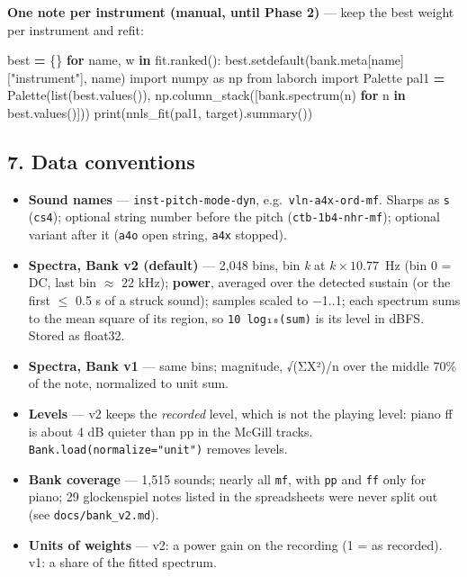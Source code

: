 \documentclass[
  10pt,
]{article}
\newenvironment{Shaded}{\begin{snugshade}}{\end{snugshade}}
\newcommand{\BuiltInTok}[1]{#1}
\newcommand{\ControlFlowTok}[1]{\textcolor[rgb]{0.13,0.29,0.53}{\textbf{#1}}}
\newcommand{\ImportTok}[1]{#1}
\newcommand{\KeywordTok}[1]{\textcolor[rgb]{0.13,0.29,0.53}{\textbf{#1}}}
\newcommand{\NormalTok}[1]{#1}
\newcommand{\OperatorTok}[1]{\textcolor[rgb]{0.81,0.36,0.00}{\textbf{#1}}}
\newcommand{\StringTok}[1]{\textcolor[rgb]{0.31,0.60,0.02}{#1}}
\providecommand{\tightlist}{%
  \setlength{\itemsep}{0pt}\setlength{\parskip}{0pt}}
\begin{document}
\textbf{One note per instrument (manual, until Phase 2)} ---
keep the best weight per instrument and refit:

\begin{Shaded}
\begin{Highlighting}[]
\NormalTok{best }\OperatorTok{=}\NormalTok{ \{\}}
\ControlFlowTok{for}\NormalTok{ name, w }\KeywordTok{in}\NormalTok{ fit.ranked():}
\NormalTok{    best.setdefault(bank.meta[name][}\StringTok{"instrument"}\NormalTok{], name)}
\ImportTok{import}\NormalTok{ numpy }\ImportTok{as}\NormalTok{ np}
\ImportTok{from}\NormalTok{ laborch }\ImportTok{import}\NormalTok{ Palette}
\NormalTok{pal1 }\OperatorTok{=}\NormalTok{ Palette(}\BuiltInTok{list}\NormalTok{(best.values()),}
\NormalTok{               np.column\_stack([bank.spectrum(n) }\ControlFlowTok{for}\NormalTok{ n }\KeywordTok{in}\NormalTok{ best.values()]))}
\BuiltInTok{print}\NormalTok{(nnls\_fit(pal1, target).summary())}
\end{Highlighting}
\end{Shaded}

\subsection{7. Data conventions}

\begin{itemize}
\tightlist
\item
  \textbf{Sound names} --- \texttt{inst-pitch-mode-dyn},
  e.g.~\texttt{vln-a4x-ord-mf}. Sharps as \texttt{s}
  (\texttt{cs4}); optional string number before the pitch
  (\texttt{ctb-1b4-nhr-mf}); optional variant after it
  (\texttt{a4o} open string, \texttt{a4x} stopped).
\item
  \textbf{Spectra, Bank v2 (default)} --- 2,048 bins, bin
  \emph{k} at $k \times 10.77$~Hz (bin 0 = DC, last bin $\approx$ 22
  kHz); \textbf{power}, averaged over the detected sustain
  (or the first $\le$ 0.5 s of a struck sound); samples scaled
  to −1..1; each spectrum sums to the mean square of its
  region, so \texttt{10\ log₁₀(sum)} is its level in dBFS.
  Stored as float32.
\item
  \textbf{Spectra, Bank v1} --- same bins; magnitude,
  √(Σ\textbar X\textbar²)/n over the middle 70\% of the
  note, normalized to unit sum.
\item
  \textbf{Levels} --- v2 keeps the \emph{recorded} level,
  which is not the playing level: piano ff is about 4 dB
  quieter than pp in the McGill tracks.
  \texttt{Bank.load(normalize="unit")} removes levels.
\item
  \textbf{Bank coverage} --- 1,515 sounds; nearly all
  \texttt{mf}, with \texttt{pp} and \texttt{ff} only for
  piano; 29 glockenspiel notes listed in the spreadsheets
  were never split out (see \texttt{docs/bank\_v2.md}).
\item
  \textbf{Units of weights} --- v2: a power gain on the
  recording (1 = as recorded). v1: a share of the fitted
  spectrum.
\end{itemize}
\end{document}
